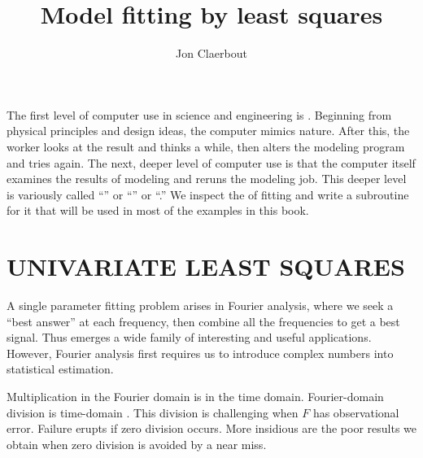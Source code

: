 
\title{Model fitting by least squares}
\author{Jon Claerbout}

\maketitle

\label{paper:lsq}

\def\ff{{\bf f}}
\def\dd{{\bf d}}

\par
The first level of computer use in science and engineering is .
Beginning from physical principles and design ideas,
the computer mimics nature.
After this, the worker looks at the result and thinks a while,
then alters the modeling program and tries again.
The next, deeper level of computer use is that the computer itself
examines the results of modeling and reruns the modeling job.
This deeper level
is variously called
``'' or
``'' or
``.''
We inspect the  of fitting
and write a subroutine for it that will be used in most of
the examples in this book.

\section{UNIVARIATE LEAST SQUARES}
A single parameter fitting problem arises in Fourier analysis,
where we seek a ``best answer'' at each frequency,
then combine all the frequencies to get a best signal.
Thus emerges a wide family of interesting and useful applications.
However, Fourier analysis first requires us to introduce complex numbers
into statistical estimation.
\par
Multiplication in the Fourier domain is  in the time domain.
Fourier-domain division is time-domain .
This division is challenging when $F$ has observational error.
Failure erupts if zero division occurs.
More insidious are the poor results we obtain
when zero division is avoided by a near miss.

